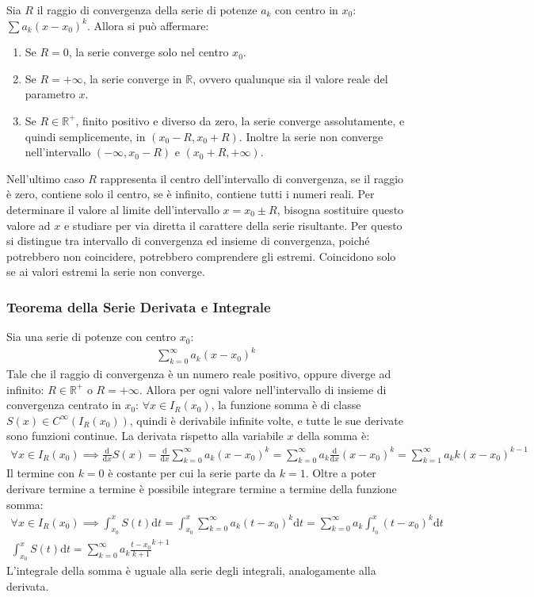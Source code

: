 \documentclass{article}
\numberwithin{equation}{subsection}
\begin{document}
Sia $R$ il raggio di convergenza della serie di potenze $a_k$ con centro in $x_0$: $\sum a_k(x-x_0)^k$. Allora si può affermare:
\begin{enumerate}
    \item Se $R=0$, la serie converge solo nel centro $x_0$. 
    \item Se $R=+\infty$, la serie converge in $\mathbb{R}$, ovvero qualunque sia il valore reale del parametro $x$. 
    \item Se $R\in\mathbb{R}^+$, finito positivo e diverso da zero, la serie converge assolutamente, e quindi semplicemente, in $(x_0-R, x_0+R)$. Inoltre la serie non converge nell'intervallo $(-\infty,x_0-R)$ e $(x_0+R, +\infty)$. 
\end{enumerate}

Nell'ultimo caso $R$ rappresenta il centro dell'intervallo di convergenza, se il raggio è zero, contiene solo il centro, se è infinito, contiene tutti i numeri reali. 
Per determinare il valore al limite dell'intervallo $x=x_0\pm R$, bisogna sostituire questo valore ad $x$ e studiare per via diretta il carattere della serie risultante. Per questo si distingue tra intervallo di convergenza ed insieme di convergenza, poiché potrebbero non coincidere, potrebbero comprendere gli estremi. Coincidono solo se ai valori estremi la serie non converge. 

\subsubsection{Teorema della Serie Derivata e Integrale}

Sia una serie di potenze con centro $x_0$:
\begin{gather*}
    \displaystyle\sum_{k=0}^\infty a_k(x-x_0)^k
\end{gather*}
Tale che il raggio di convergenza è un numero reale positivo, oppure diverge ad infinito: $R\in\mathbb{R}^+$ o $R=+\infty$. 
Allora per ogni valore nell'intervallo di insieme di convergenza centrato in $x_0$: 
$\forall x\in I_R(x_0)$, la funzione somma è di classe $S(x)\in C^{\infty}(I_R(x_0))$, quindi è derivabile infinite volte, e tutte le sue derivate sono funzioni continue. La derivata rispetto alla variabile $x$ della somma è:
\begin{gather*}
    \forall x \in I_R(x_0)\implies\displaystyle\frac{\mathrm{d}}{\mathrm{d}x}S(x)=
    \frac{\mathrm{d}}{\mathrm{d}x}\sum_{k=0}^\infty a_k(x-x_0)^k=
    \sum_{k=0}^\infty a_k\frac{\mathrm{d}}{\mathrm{d}x}(x-x_0)^k=
    \sum_{k=1}^\infty a_kk(x-x_0)^{k-1}
\end{gather*}
Il termine con $k=0$ è costante per cui la serie parte da $k=1$.
Oltre a poter derivare termine a termine è possibile integrare termine a termine della funzione somma:
\begin{gather*}
    \forall x\in I_R(x_0)\implies\displaystyle\int_{x_0}^xS(t)\mathrm{d}t=\int_{x_0}^x\sum_{k=0}^\infty a_k(t-x_0)^k\mathrm{d}t=\sum_{k=0}^\infty a_k\int_{t_0}^x(t-x_0)^k\mathrm{d}t\\
    \displaystyle\int_{x_0}^xS(t)\mathrm{d}t=
    \sum_{k=0}^\infty a_k\frac{t-x_0}{k+1}^{k+1}
\end{gather*}
L'integrale della somma è uguale alla serie degli integrali, analogamente alla derivata. 
\end{document}
